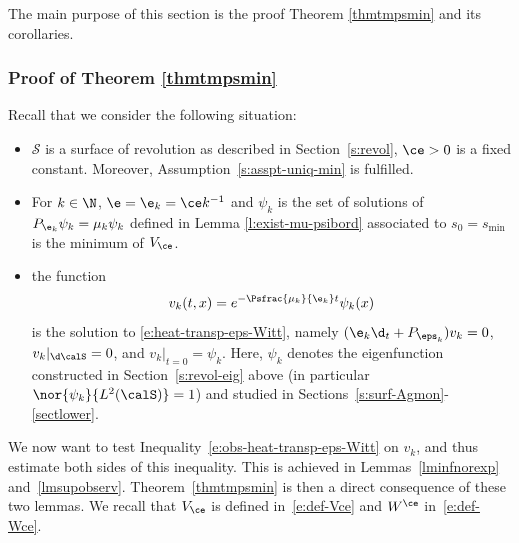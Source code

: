 The main purpose of this section is the proof Theorem \ref{thmtmpsmin} and its corollaries.
\subsubsection{Proof of Theorem \ref{thmtmpsmin}}

Recall that we consider the following situation:
\begin{itemize}
\item $\mathcal{S}$ is a surface of revolution as described in Section~\ref{s:revol}, $\ce>0$ is a fixed constant. Moreover, Assumption~\eqref{s:asspt-uniq-min} is fulfilled.
\item For $k\in \N$, $\e=\e_k=\ce k^{-1}$ and $\psi_k$ is the set of solutions of $P_{\e_k} \psi_k = \mu_k \psi_k$ defined in Lemma \ref{l:exist-mu-psibord} associated to $s_{0}=s_{\min}$ is the minimum of $V_{\ce}$.
\item the function
\begin{equation}
\label{e:def-vk}
v_k(t,x)=e^{-\Psfrac{\mu_k}{\e_{k}} t}\psi_k(x)
\end{equation}
is the solution to \eqref{e:heat-transp-eps-Witt}, namely $(\e_k \d_t + P_{\eps_k})v_k = 0$, $v_k|_{\d\calS}=0$, and $v_k|_{t=0} = \psi_k$. Here, $\psi_k$ denotes the eigenfunction constructed in Section~\ref{s:revol-eig} above (in particular $\nor{\psi_k}{L^2(\calS)}=1$) and studied in Sections~\ref{s:surf-Agmon}-\ref{sectlower}.
\end{itemize}
We now want to test Inequality~\eqref{e:obs-heat-transp-eps-Witt} on $v_k$, and thus estimate both sides of this inequality. This is achieved in Lemmas~\ref{lminfnorexp} and~\ref{lmsupobserv}.
Theorem~\ref{thmtmpsmin} is then a direct consequence of these two lemmas.
We recall that $V_\ce$ is defined in~\eqref{e:def-Vce} and $W^{\ce}$ in~\eqref{e:def-Wce}.

